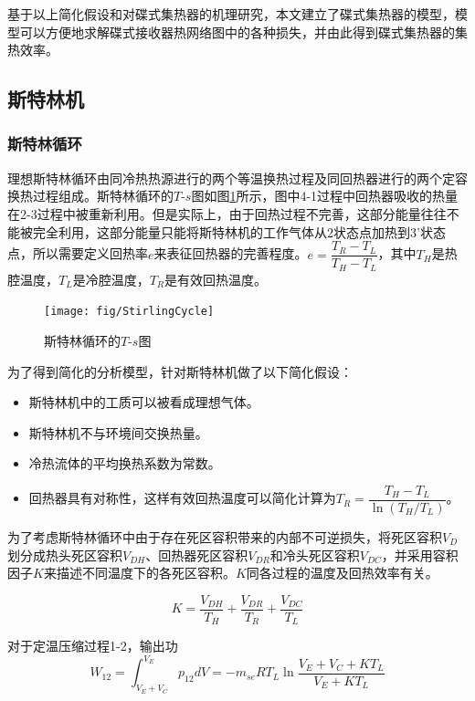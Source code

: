 基于以上简化假设和对碟式集热器的机理研究，本文建立了碟式集热器的模型，模型可以方便地求解碟式接收器热网络图中的各种损失，并由此得到碟式集热器的集热效率。

\subsection{斯特林机}
\label{sec:StirlingEngineModel}
\subsubsection{斯特林循环}
理想斯特林循环由同冷热热源进行的两个等温换热过程及同回热器进行的两个定容换热过程组成。斯特林循环的$T$-$s$图如图\ref{fig:StirlingCycle}所示，图中4-1过程中回热器吸收的热量在2-3过程中被重新利用。但是实际上，由于回热过程不完善，这部分能量往往不能被完全利用，这部分能量只能将斯特林机的工作气体从2状态点加热到3'状态点，所以需要定义回热率$e$来表征回热器的完善程度\cite{Formosa2010,Juhasz2010}。$e=\dfrac{T_R-T_L}{T_H-T_L}$，其中$T_H$是热腔温度，$T_L$是冷腔温度，$T_R$是有效回热温度。

\begin{figure}[htbp]
\centering
	\texttt{[image: fig/StirlingCycle]}
	\caption{斯特林循环的$T$-$s$图}
	\label{fig:StirlingCycle}
\end{figure}

为了得到简化的分析模型，针对斯特林机做了以下简化假设：

\begin{itemize}
\item 斯特林机中的工质可以被看成理想气体。
\item 斯特林机不与环境间交换热量。
\item 冷热流体的平均换热系数为常数。
\item 回热器具有对称性，这样有效回热温度可以简化计算为$T_{R}=\dfrac{T_{H}-T_{L}}{\ln(T_{H}/T_{L})}$\cite{Formosa2010,Juhasz2010}。
\end{itemize}

为了考虑斯特林循环中由于存在死区容积带来的内部不可逆损失，将死区容积$V_D$划分成热头死区容积$V_{DH}$、回热器死区容积$V_{DR}$和冷头死区容积$V_{DC}$\cite{Duan2014}，并采用容积因子$K$来描述不同温度下的各死区容积。$K$同各过程的温度及回热效率有关。

\begin{equation}
	K = \frac{V_{DH}}{T_H} + \frac{V_{DR}}{T_R} + \frac{V_{DC}}{T_L}
\end{equation}


对于定温压缩过程1-2，输出功
\begin{equation}
	W_{12} = \int^{V_E}_{V_E+V_C}{p_{12}dV}=-m_{se}RT_L\ln{\frac{V_E+V_C+KT_L}{V_E+KT_L}}
\end{equation}

